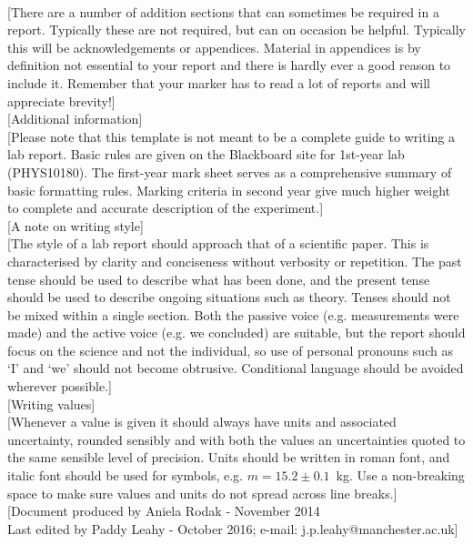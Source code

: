 \documentclass[11pt]{article} %
\begin{document}
{\color{blue}{\Large [Optional sections]}\\

 [There are a number of addition sections that can sometimes be required in a report. Typically these are not required, but can on occasion be helpful. Typically this will be acknowledgements or appendices. Material in appendices is by definition not essential to your report and there is hardly ever a good reason to include it. Remember that your marker has to read a lot of reports and will appreciate brevity!]\\

{\Large [Additional information]}\\

 [Please note that this template is not meant to be a complete guide to writing a lab report.
Basic rules are given on the Blackboard site for 1st-year lab (PHYS10180). The first-year mark sheet serves as a comprehensive summary of basic formatting rules. Marking criteria in second year give much higher weight to complete and accurate description of the experiment.]\\

{\Large [A note on writing style]}\\

 [The style of a lab report should approach that of a scientific paper. This is characterised by clarity and conciseness without verbosity or repetition. The past tense should be used to describe what has been done, and the present tense should be used to describe ongoing situations such as theory. Tenses should not be mixed within a single section. Both the passive voice (e.g. measurements were made) and the active voice (e.g. we concluded) are suitable, but the report should focus on the science and not the individual, so use of personal pronouns such as `I' and  `we' should not become obtrusive. Conditional language should be avoided wherever possible.]\\

{\Large [Writing values]}\\

[Whenever a value is given it should always have units and associated uncertainty, rounded sensibly and with both the values an 
uncertainties quoted to the same sensible level of precision. Units should be written in roman font, and italic font should be used for 
symbols, e.g. \mbox{$m = 15.2 \pm 0.1$~kg}. Use a non-breaking space to make sure values and units do not spread across line 
breaks.]\\

 [Document produced by Aniela Rodak - November 2014\\
 Last edited by Paddy Leahy - October 2016; e-mail: j.p.leahy@manchester.ac.uk]
}
\end{document}

